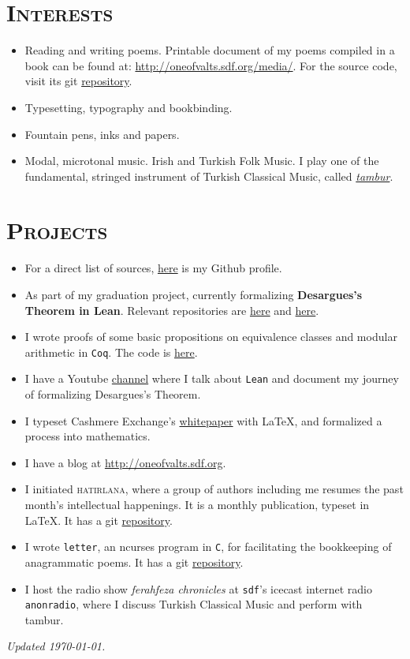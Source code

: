 \documentclass[oneside, 11pt]{memoir}
\begin{document}
\section*{\textsc{Interests}}
\begin{itemize}[leftmargin=*]
  \item Reading and writing poems. Printable document of my poems
    compiled in a book can be found at:
    \url{http://oneofvalts.sdf.org/media/}. For the source code, visit
    its git \href{https://github.com/oneofvalts/usavurdu}{repository}.
  \item Typesetting, typography and bookbinding.
  \item Fountain pens, inks and papers.
  \item Modal, microtonal music. Irish and Turkish Folk Music. I play one
    of the fundamental, stringed instrument of Turkish Classical Music,
    called
    \href{https://en.wikipedia.org/wiki/Turkish_tambur}{\textit{tambur}}.
\end{itemize}
\section*{\textsc{Projects}}
\begin{itemize}[leftmargin=*]
  \item For a direct list of sources,
    \href{https://github.com/oneofvalts}{here} is my Github profile.
  \item As part of my graduation project, currently formalizing
    \textbf{Desargues's Theorem in Lean}. Relevant repositories are
    \href{https://github.com/oneofvalts/desargues-doc}{here} and
    \href{https://github.com/oneofvalts/desargues}{here}.
  \item I wrote proofs of some basic propositions on equivalence classes
    and modular arithmetic in \texttt{Coq}. The code is
    \href{https://github.com/oneofvalts/equivalence-classes}{here}.
  \item I have a Youtube
    \href{https://www.youtube.com/@veryarticulateloudthinker}{channel}
    where I talk about \texttt{Lean} and document my journey of
    formalizing Desargues's Theorem.
  \item I typeset Cashmere Exchange's
    \href{https://docsend.com/view/ryp2wmfc5yxaabep}{whitepaper} with
    \LaTeX, and formalized a process into mathematics.
  \item I have a blog at \url{http://oneofvalts.sdf.org}.
  \item I initiated \textsc{hatirlana}, where a group of authors including me
  resumes the past month's intellectual happenings. It is a monthly
  publication, typeset in \LaTeX. It has a git
  \href{https://github.com/oneofvalts/hatirlana}{repository}.
  \item I wrote \texttt{letter}, an ncurses program in \texttt{C}, for
  facilitating the bookkeeping of anagrammatic poems. It has a git
  \href{https://github.com/oneofvalts/letter}{repository}.
  \item I host the radio show \textit{ferahfeza chronicles} at \texttt{sdf}'s
  icecast internet radio \texttt{anonradio}, where I discuss Turkish
  Classical Music and perform with tambur.
\end{itemize}
\vfill\hfill{}\tiny\textit{Updated \today.}
\end{document}

